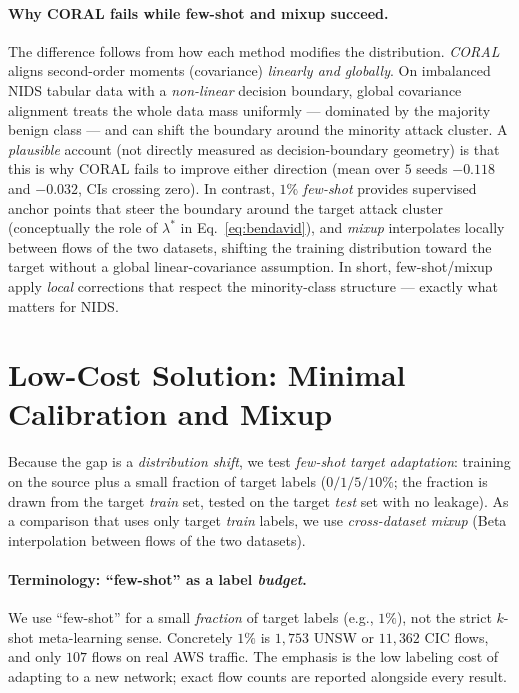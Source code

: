 \documentclass[preprint,12pt,authoryear]{elsarticle}
\begin{document}
\paragraph{Why CORAL fails while few-shot and mixup succeed.} The difference
follows from how each method modifies the distribution. \emph{CORAL} aligns
second-order moments (covariance) \emph{linearly and globally}. On imbalanced NIDS
tabular data with a \emph{non-linear} decision boundary, global covariance
alignment treats the whole data mass uniformly --- dominated by the majority benign
class --- and can shift the boundary around the minority attack cluster. A
\emph{plausible} account (not directly measured as decision-boundary geometry) is
that this is why CORAL fails to improve either direction (mean over $5$ seeds
$-0.118$ and $-0.032$, CIs crossing zero). In contrast, $1\%$ \emph{few-shot}
provides supervised anchor points that steer the boundary around the target attack
cluster (conceptually the role of $\lambda^\ast$ in Eq.~\eqref{eq:bendavid}), and
\emph{mixup} interpolates locally between flows of the two datasets, shifting the
training distribution toward the target without a global linear-covariance
assumption. In short, few-shot/mixup apply \emph{local} corrections that respect the
minority-class structure --- exactly what matters for NIDS.

\section{Low-Cost Solution: Minimal Calibration and Mixup}
\label{sec:da}

Because the gap is a \emph{distribution shift}, we test \emph{few-shot target
adaptation}: training on the source plus a small fraction of target labels
($0/1/5/10\%$; the fraction is drawn from the target \emph{train} set, tested on
the target \emph{test} set with no leakage). As a comparison that uses only target
\emph{train} labels, we use \emph{cross-dataset mixup} (Beta interpolation between
flows of the two datasets).

\paragraph{Terminology: ``few-shot'' as a label \emph{budget}.} We use ``few-shot''
for a small \emph{fraction} of target labels (e.g., $1\%$), not the strict $k$-shot
meta-learning sense. Concretely $1\%$ is $1{,}753$ UNSW or $11{,}362$ CIC flows, and
only $107$ flows on real AWS traffic. The emphasis is the low labeling cost of
adapting to a new network; exact flow counts are reported alongside every result.
\end{document}
